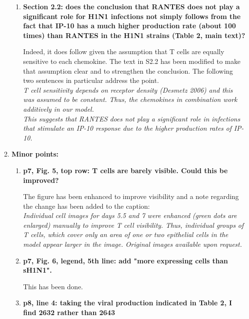 \documentclass[10pt]{article}
\begin{document}
\begin{enumerate}
\begin{enumerate}
	\item \textbf{Section 2.2: does the conclusion that RANTES does not play a significant role for H1N1 infections not simply follows from the fact that IP-10 has a much higher production rate (about 100 times) than RANTES in the H1N1 strains (Table 2, main text)?}
        
	Indeed, it does follow given the assumption that T cells are equally sensitive to each chemokine.  The text in S2.2 has been modified to make that assumption clear and to strengthen the conclusion.  The following two sentences in particular address the point. \\
	
	\textit{T cell sensitivity depends on receptor density (Desmetz 2006) and this was assumed to be constant.  Thus, the chemokines in combination work additively in our model.} \\
	
	\textit{This suggests that RANTES does not play a significant role in infections that stimulate an IP-10 response due to the higher production rates of IP-10.} \\

\end{enumerate}

\pagebreak

\item \textbf{Minor points:}
\begin{enumerate}
	\item \textbf{p7, Fig. 5, top row: T cells are barely visible. Could this be improved?}
	
	The figure has been enhanced to improve visibility and a note regarding the change has been added to the caption: \\
	
	\textit{Individual cell images for days 5.5 and 7 were enhanced (green dots are enlarged) manually to improve T cell visibility.  Thus, individual groups of T cells, which cover only an area of one or two epithelial cells in the model appear larger in the image.  Original images available upon request.} \\
	
	\item \textbf{p7, Fig. 6, legend, 5th line:  add "more expressing cells than sH1N1".}
	
	This has been done. \\
	
	\item \textbf{p8, line 4: taking the viral production indicated in Table 2, I find 2632 rather than 2643}
	

\end{enumerate}
\end{enumerate}
\end{document}
